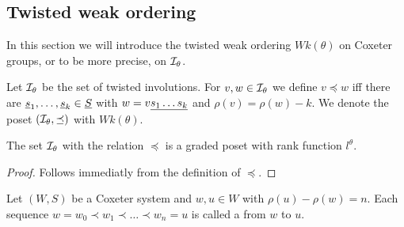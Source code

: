 \subsection{Twisted weak ordering}
\label{sec:twisted-involutions-twisted-weak-ordering}

In this section we will introduce the twisted weak ordering $Wk(\theta)$ on Coxeter groups, or to be more precise, on $\mathcal{I}_{\theta}$.

\begin{defi}
	Let $\mathcal{I}_{\theta}$ be the set of twisted involutions. For $v,w \in \mathcal{I}_{\theta}$ we define $v \preceq w$ iff there are $\underline{s}_1, \ldots, \underline{s}_k \in \underline{S}$ with $w = v \underline{ s_1 \ldots s_k }$ and $\rho(v) = \rho(w) - k$. We denote the poset $(\mathcal{I}_{\theta},\preceq)$ with $Wk(\theta)$.
\end{defi}

\begin{lemm}
	The set $\mathcal{I}_{\theta}$ with the relation $\preceq$ is a graded poset with rank function $l^\theta$.

	\begin{proof}
		Follows immediatly from the definition of $\preceq$.
	\end{proof}
\end{lemm}

\begin{defi}
	Let $(W,S)$ be a Coxeter system and $w,u \in W$ with $\rho(u) - \rho(w) = n$. Each sequence $w = w_0 \prec w_1 \prec \ldots \prec w_n = u$ is called a  from $w$ to $u$.
\end{defi}

\todo